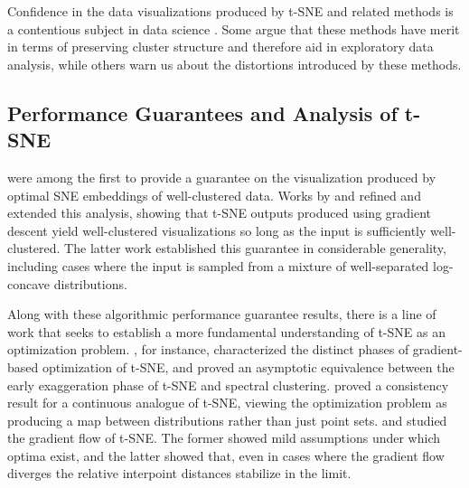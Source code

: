 




Confidence in the data visualizations produced by t-SNE and related methods is a contentious subject in data science \citep{marx2024seeing, debodt2025lowdimensionalembeddingshighdimensionaldata}. Some argue that these methods have merit in terms of preserving cluster structure and therefore aid in exploratory data analysis, while others warn us about the distortions introduced by these methods.



\subsection{Performance Guarantees and Analysis of t-SNE}

\citet{shaham2017stochastic} were among the first to provide a guarantee on the visualization produced by optimal SNE embeddings of well-clustered data. Works by
\citet{linderman2019clustering} and 
\citet{arora2018analysis} refined and extended this analysis, showing that t-SNE outputs produced using gradient descent yield well-clustered visualizations so long as the input is sufficiently well-clustered. The latter work established this guarantee in considerable generality, including cases where the input is sampled from a mixture of well-separated log-concave distributions.

Along with these algorithmic performance guarantee results, there is a line of work that seeks to establish a more fundamental understanding of t-SNE as an optimization problem. \citet{cai2022theoretical}, for instance, characterized the distinct phases of gradient-based optimization of t-SNE, and proved an asymptotic equivalence between the early exaggeration phase of t-SNE and spectral clustering. \citet{auffinger2023equilibrium} proved a consistency result for a continuous analogue of t-SNE, viewing the optimization problem as producing a map between distributions rather than just point sets. \citet{jeong2024convergence} and \citet{weinkove2024stochastic} studied the gradient flow of t-SNE. The former showed mild assumptions under which optima exist, and the latter showed that, even in cases where the gradient flow diverges the relative interpoint distances stabilize in the limit.%

